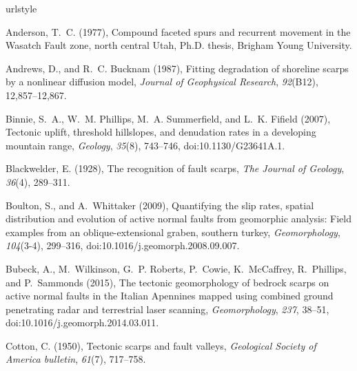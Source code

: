 \begin{thebibliography}{50}
\providecommand{\natexlab}[1]{#1}
\expandafter\ifx\csname urlstyle\endcsname\relax
  \providecommand{\doi}[1]{doi:\discretionary{}{}{}#1}\else
  \providecommand{\doi}{doi:\discretionary{}{}{}\begingroup
  \urlstyle{rm}\Url}\fi

Anderson, T.~C. (1977), {Compound faceted spurs and recurrent movement in the
  Wasatch Fault zone, north central Utah}, Ph.D. thesis, Brigham Young
  University.

Andrews, D., and R.~C. Bucknam (1987), Fitting degradation of shoreline scarps
  by a nonlinear diffusion model, \textit{Journal of Geophysical Research},
  \textit{92}(B12), 12,857--12,867.

Binnie, S.~A., W.~M. Phillips, M.~A. Summerfield, and L.~K. Fifield (2007),
  Tectonic uplift, threshold hillslopes, and denudation rates in a developing
  mountain range, \textit{Geology}, \textit{35}(8), 743--746,
  \doi{10.1130/G23641A.1}.

Blackwelder, E. (1928), The recognition of fault scarps, \textit{The Journal of
  Geology}, \textit{36}(4), 289--311.

Boulton, S., and A.~Whittaker (2009), Quantifying the slip rates, spatial
  distribution and evolution of active normal faults from geomorphic analysis:
  Field examples from an oblique-extensional graben, southern turkey,
  \textit{Geomorphology}, \textit{104}(3-4), 299--316,
  \doi{10.1016/j.geomorph.2008.09.007}.

Bubeck, A., M.~Wilkinson, G.~P. Roberts, P.~Cowie, K.~McCaffrey, R.~Phillips,
  and P.~Sammonds (2015), {The tectonic geomorphology of bedrock scarps on
  active normal faults in the Italian Apennines mapped using combined ground
  penetrating radar and terrestrial laser scanning}, \textit{Geomorphology},
  \textit{237}, 38--51, \doi{10.1016/j.geomorph.2014.03.011}.

Cotton, C. (1950), Tectonic scarps and fault valleys, \textit{Geological
  Society of America bulletin}, \textit{61}(7), 717--758.


\end{thebibliography}
